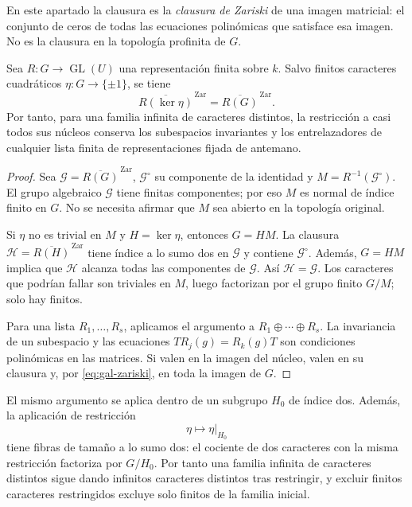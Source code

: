 En este apartado la clausura es la \emph{clausura de Zariski}
de una imagen matricial: el conjunto de ceros de todas las
ecuaciones polinómicas que satisface esa imagen.
No es la clausura en la topología profinita de $G$.

\begin{lema}
\label{lem:gal-zariski}
Sea $R:G\to\operatorname{GL}(U)$ una representación finita
sobre $k$. Salvo finitos caracteres cuadráticos
$\eta:G\to\{\pm1\}$, se tiene
\begin{equation}
 \overline{R(\ker\eta)}^{\,\mathrm{Zar}}
       =\overline{R(G)}^{\,\mathrm{Zar}}.
 \label{eq:gal-zariski}
\end{equation}
Por tanto, para una familia infinita de caracteres distintos,
la restricción a casi todos sus núcleos conserva los subespacios
invariantes y los entrelazadores de cualquier lista finita
de representaciones fijada de antemano.
\end{lema}

\begin{proof}
Sea $\mathcal G=\overline{R(G)}^{\,\mathrm{Zar}}$,
$\mathcal G^\circ$ su componente de la identidad y
$M=R^{-1}(\mathcal G^\circ)$.
El grupo algebraico $\mathcal G$ tiene finitas componentes;
por eso $M$ es normal de índice finito en $G$.
No se necesita afirmar que $M$ sea abierto en la topología original.

Si $\eta$ no es trivial en $M$ y $H=\ker\eta$,
entonces $G=HM$.
La clausura $\mathcal H=\overline{R(H)}^{\,\mathrm{Zar}}$
tiene índice a lo sumo dos en $\mathcal G$ y contiene
$\mathcal G^\circ$. Además, $G=HM$ implica que
$\mathcal H$ alcanza todas las componentes de $\mathcal G$.
Así $\mathcal H=\mathcal G$.
Los caracteres que podrían fallar son triviales en $M$,
luego factorizan por el grupo finito $G/M$;
solo hay finitos.

Para una lista $R_1,\ldots,R_s$, aplicamos el argumento
a $R_1\oplus\cdots\oplus R_s$.
La invariancia de un subespacio y las ecuaciones
$T R_j(g)=R_k(g)T$ son condiciones polinómicas en las matrices.
Si valen en la imagen del núcleo, valen en su clausura y,
por \eqref{eq:gal-zariski}, en toda la imagen de $G$.
\end{proof}

El mismo argumento se aplica dentro de un subgrupo $H_0$
de índice dos. Además, la aplicación de restricción
\begin{equation}
 \eta\longmapsto\eta|_{H_0}
 \label{eq:gal-fibras}
\end{equation}
tiene fibras de tamaño a lo sumo dos: el cociente de dos
caracteres con la misma restricción factoriza por $G/H_0$.
Por tanto una familia infinita de caracteres distintos
sigue dando infinitos caracteres distintos tras restringir,
y excluir finitos caracteres restringidos excluye solo
finitos de la familia inicial.


